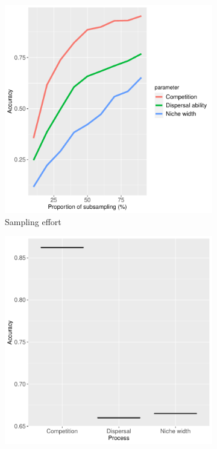 	\begin{figure}
		\centering
		\begin{subfigure}[b]{0.47\textwidth}
			\includegraphics[width=\textwidth]{./figures/Robustness_sampling_effort_Accuracy.pdf}
			\caption{Sampling effort}
			\label{fig:robust-time}
		\end{subfigure}
		\begin{subfigure}[b]{0.47\textwidth}
			\includegraphics[width=\textwidth]{./figures/Robustness_time_step_Accuracy_distribution.pdf}

\end{subfigure}
\end{figure}
